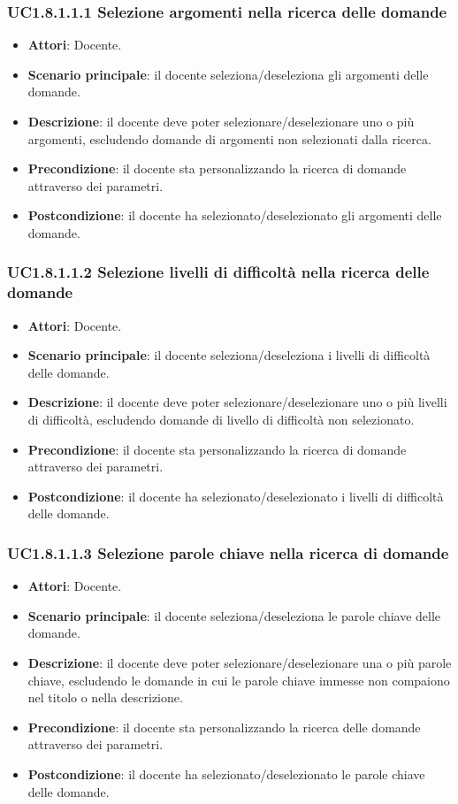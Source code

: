 \subsubsection{UC1.8.1.1.1 Selezione argomenti nella ricerca delle domande}
\begin{itemize}
\item \textbf{Attori}: Docente.
\item \textbf{Scenario principale}: il docente seleziona/deseleziona gli argomenti delle domande.
\item \textbf{Descrizione}: il docente deve poter selezionare/deselezionare uno o più argomenti, escludendo domande di argomenti non selezionati dalla ricerca.
\item \textbf{Precondizione}: il docente sta personalizzando la ricerca di domande attraverso dei parametri.
\item \textbf{Postcondizione}: il docente ha selezionato/deselezionato gli argomenti delle domande.
\end{itemize}
\subsubsection{UC1.8.1.1.2 Selezione livelli di difficoltà nella ricerca delle domande}
\begin{itemize}
\item \textbf{Attori}: Docente.
\item \textbf{Scenario principale}: il docente seleziona/deseleziona i livelli di difficoltà delle domande.
\item \textbf{Descrizione}: il docente deve poter selezionare/deselezionare uno o più livelli di difficoltà, escludendo domande di livello di difficoltà non selezionato.
\item \textbf{Precondizione}: il docente sta personalizzando la ricerca di domande attraverso dei parametri.
\item \textbf{Postcondizione}: il docente ha selezionato/deselezionato i livelli di difficoltà delle domande.
\end{itemize}
\subsubsection{UC1.8.1.1.3 Selezione parole chiave nella ricerca di domande}
\begin{itemize}
\item \textbf{Attori}: Docente.
\item \textbf{Scenario principale}: il docente seleziona/deseleziona le parole chiave delle domande.
\item \textbf{Descrizione}: il docente deve poter selezionare/deselezionare una o più parole chiave, escludendo le domande in cui le parole chiave immesse non compaiono nel titolo o nella descrizione.
\item \textbf{Precondizione}: il docente sta personalizzando la ricerca delle domande attraverso dei parametri.
\item \textbf{Postcondizione}: il docente ha selezionato/deselezionato le parole chiave delle domande.
\end{itemize}
